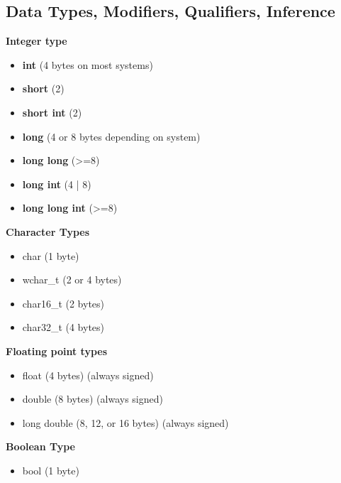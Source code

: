 \documentclass{report}
\begin{document}
    \subsection{Data Types, Modifiers, Qualifiers, Inference}
    \begin{minipage}[t]{0.47\textwidth}
    \textbf{Integer type}
    \begin{itemize}
        \item \textbf{int} (4 bytes on most systems)
        \item \textbf{short} (2)
        \item \textbf{short int} (2)
        \item \textbf{long} (4 or 8 bytes depending on system)
        \item \textbf{long long} (>=8)
        \item \textbf{long int} (4 | 8)
        \item \textbf{long long int} (>=8)
    \end{itemize}
\end{minipage}
\begin{minipage}[t]{0.47\textwidth}
    \textbf{Character Types}
    \begin{itemize}
        \item char (1 byte)
        \item wchar\_t (2 or 4 bytes)
        \item char16\_t (2 bytes)
        \item char32\_t (4 bytes)
    \end{itemize}
\end{minipage}
\bigbreak \noindent 
\begin{minipage}[t]{0.47\textwidth}
    \textbf{Floating point types}
    \begin{itemize}
        \item float (4 bytes) (always signed)
        \item double (8 bytes) (always signed)
        \item long double (8, 12, or 16 bytes) (always signed)
    \end{itemize}
\end{minipage}
\begin{minipage}[t]{0.47\textwidth}
    \textbf{Boolean Type}
    \begin{itemize}
        \item bool (1 byte)
    \end{itemize}
\end{minipage}
\bigbreak \noindent \bigbreak \noindent 
\end{document}
